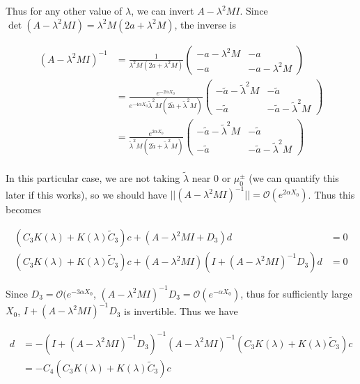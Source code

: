 \documentclass[12pt]{article}
\begin{document}
Thus for any other value of $\lambda$, we can invert $A - \lambda^2 M I$. Since $\det(A - \lambda^2 M I) = \lambda^2 M(2a + \lambda^2 M)$, the inverse is

\begin{align*}
(A - \lambda^2 M I)^{-1} &=
\frac{1}{\lambda^2 M(2a + \lambda^2 M)}
\begin{pmatrix}
-a - \lambda^2 M & -a \\
-a & -a - \lambda^2 M
\end{pmatrix} \\
&= \frac{e^{-2 \alpha X_0}}{e^{-4 \alpha X_0} \tilde{\lambda}^2 M(2\tilde{a} + \tilde{\lambda}^2 M)}
\begin{pmatrix}
-\tilde{a} - \tilde{\lambda}^2 M & -\tilde{a} \\
-\tilde{a} & -\tilde{a} - \tilde{\lambda}^2 M
\end{pmatrix} \\
&= \frac{e^{2 \alpha X_0}}{\tilde{\lambda}^2 M(2\tilde{a} + \tilde{\lambda}^2 M)}
\begin{pmatrix}
-\tilde{a} - \tilde{\lambda}^2 M & -\tilde{a} \\
-\tilde{a} & -\tilde{a} - \tilde{\lambda}^2 M
\end{pmatrix} \\
\end{align*}

In this particular case, we are not taking $\tilde{\lambda}$ near 0 or $\mu_0^\pm$ (we can quantify this later if this works), so we should have $||(A - \lambda^2 M I)^{-1}|| = \mathcal{O}( e^{2 \alpha X_0} )$. Thus this becomes

\begin{align*}
(C_3 K(\lambda) + K(\lambda) \tilde{C}_3) c + (A - \lambda^2 MI + D_3)d &= 0 \\
(C_3 K(\lambda) + K(\lambda) \tilde{C}_3) c + (A - \lambda^2 MI)(I + (A - \lambda^2 MI)^{-1} D_3)d &= 0
\end{align*}

Since $D_3 = \mathcal{O}(e^{-3 \alpha X_0}$, $(A - \lambda^2 MI)^{-1} D_3 = \mathcal{O}(e^{-\alpha X_0})$, thus for sufficiently large $X_0$, $I + (A - \lambda^2 MI)^{-1} D_3$ is invertible. Thus we have

\begin{align*}
 d &= 
 -(I + (A - \lambda^2 MI)^{-1} D_3)^{-1}(A - \lambda^2 MI)^{-1}(C_3 K(\lambda) + K(\lambda) \tilde{C}_3) c \\
 &= -C_4 (C_3 K(\lambda) + K(\lambda) \tilde{C}_3) c
\end{align*}
\end{document}
